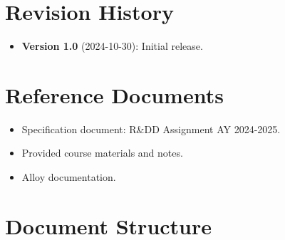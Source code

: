 \section{Revision History}
\label{sec:revision-history}%

\begin{itemize}
    \item \textbf{Version 1.0} (2024-10-30): Initial release.
\end{itemize}

\section{Reference Documents}
\label{sec:reference-documents}%

\begin{itemize}
    \item Specification document: R\&DD Assignment AY 2024-2025.
    \item Provided course materials and notes.
    \item Alloy documentation.
\end{itemize}

\section{Document Structure}
\label{sec:document-structure}%

